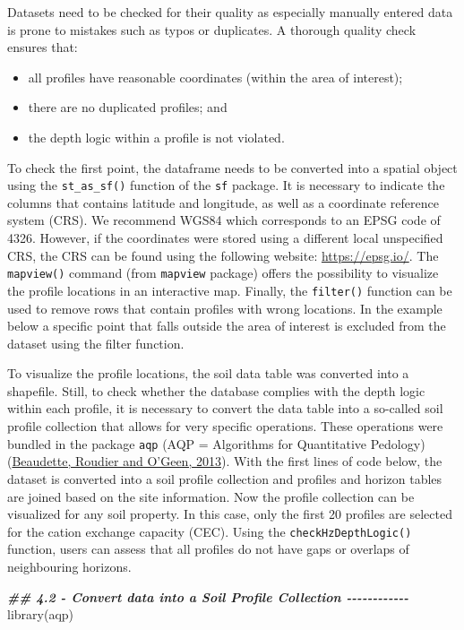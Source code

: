 \documentclass[
  10pt,
  b5paper,
  oneside]{book}
\newenvironment{Shaded}{\begin{snugshade}}{\end{snugshade}}
\newcommand{\DocumentationTok}[1]{\textcolor[rgb]{0.56,0.35,0.01}{\textbf{\textit{#1}}}}
\newcommand{\FunctionTok}[1]{\textcolor[rgb]{0.00,0.00,0.00}{#1}}
\newcommand{\NormalTok}[1]{#1}
\providecommand{\tightlist}{%
  \setlength{\itemsep}{0pt}\setlength{\parskip}{0pt}}
\begin{document}
Datasets need to be checked for their quality as especially manually entered data is prone to mistakes such as typos or duplicates. A thorough quality check ensures that:

\begin{itemize}
\tightlist
\item
  all profiles have reasonable coordinates (within the area of interest);
\item
  there are no duplicated profiles; and
\item
  the depth logic within a profile is not violated.
\end{itemize}

To check the first point, the dataframe needs to be converted into a spatial object using the \texttt{st\_as\_sf()} function of the \texttt{sf} package. It is necessary to indicate the columns that contains latitude and longitude, as well as a coordinate reference system (CRS). We recommend WGS84 which corresponds to an EPSG code of 4326. However, if the coordinates were stored using a different local unspecified CRS, the CRS can be found using the following website: \url{https://epsg.io/}. The \texttt{mapview()} command (from \texttt{mapview} package) offers the possibility to visualize the profile locations in an interactive map. Finally, the \texttt{filter()} function can be used to remove rows that contain profiles with wrong locations. In the example below a specific point that falls outside the area of interest is excluded from the dataset using the filter function.

To visualize the profile locations, the soil data table was converted into a shapefile. Still, to check whether the database complies with the depth logic within each profile, it is necessary to convert the data table into a so-called soil profile collection that allows for very specific operations. These operations were bundled in the package \texttt{aqp} (AQP = Algorithms for Quantitative Pedology) (\protect\hyperlink{ref-beaudette2013}{Beaudette, Roudier and O'Geen, 2013}).
With the first lines of code below, the dataset is converted into a soil profile collection and profiles and horizon tables are joined based on the site information.
Now the profile collection can be visualized for any soil property. In this case, only the first 20 profiles are selected for the cation exchange capacity (CEC).
Using the \texttt{checkHzDepthLogic()} function, users can assess that all profiles do not have gaps or overlaps of neighbouring horizons.

\begin{Shaded}
\begin{Highlighting}[]
\DocumentationTok{\#\# 4.2 {-} Convert data into a Soil Profile Collection {-}{-}{-}{-}{-}{-}{-}{-}{-}{-}{-}{-}}
\FunctionTok{library}\NormalTok{(aqp)}
\end{Highlighting}
\end{Shaded}
\end{document}
